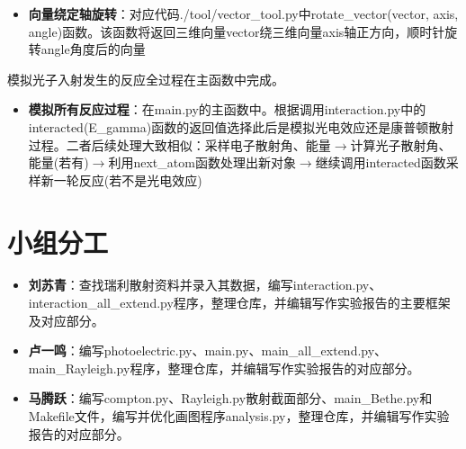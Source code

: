 \documentclass[12pt,a4paper]{article}%
\begin{document}
    \begin{tcolorbox}[width=16cm]
        \begin{itemize}
            \item \textbf{向量绕定轴旋转}：对应代码./tool/vector\_tool.py中rotate\_vector(vector, axis, angle)函数。该函数将返回三维向量vector绕三维向量axis轴正方向，顺时针旋转angle角度后的向量
        \end{itemize}
    \end{tcolorbox}
    模拟光子入射发生的反应全过程在主函数中完成。
    \begin{center}
        \begin{tcolorbox}[width=16cm]
            \begin{itemize}
                \item \textbf{模拟所有反应过程}：在main.py的主函数中。根据调用interaction.py中的interacted(E\_gamma)函数的返回值选择此后是模拟光电效应还是康普顿散射过程。二者后续处理大致相似：采样电子散射角、能量$\rightarrow$计算光子散射角、能量(若有)$\rightarrow$利用next\_atom函数处理出新对象$\rightarrow$继续调用interacted函数采样新一轮反应(若不是光电效应)
            \end{itemize}
        \end{tcolorbox}
    \end{center}
    
\newpage
\section{小组分工}
    \begin{itemize}
        \item \textbf{刘苏青}：查找瑞利散射资料并录入其数据，编写interaction.py、interaction\_all\_extend.py程序，整理仓库，并编辑写作实验报告的主要框架及对应部分。
        \item \textbf{卢一鸣}：编写photoelectric.py、main.py、main\_all\_extend.py、main\_Rayleigh.py程序，整理仓库，并编辑写作实验报告的对应部分。
        \item \textbf{马腾跃}：编写compton.py、Rayleigh.py散射截面部分、main\_Bethe.py和Makefile文件，编写并优化画图程序analysis.py，整理仓库，并编辑写作实验报告的对应部分。
    \end{itemize}
\newpage
\end{document}
